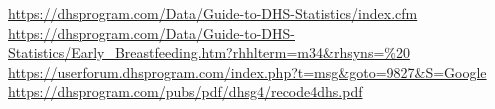 \begin{thebibliography}{9}
\url{https://dhsprogram.com/Data/Guide-to-DHS-Statistics/index.cfm}
\url{https://dhsprogram.com/Data/Guide-to-DHS-Statistics/Early_Breastfeeding.htm?rhhlterm=m34&rhsyns=%20}
\url{https://userforum.dhsprogram.com/index.php?t=msg&goto=9827&S=Google}
\url{https://dhsprogram.com/pubs/pdf/dhsg4/recode4dhs.pdf}






\end{thebibliography}
